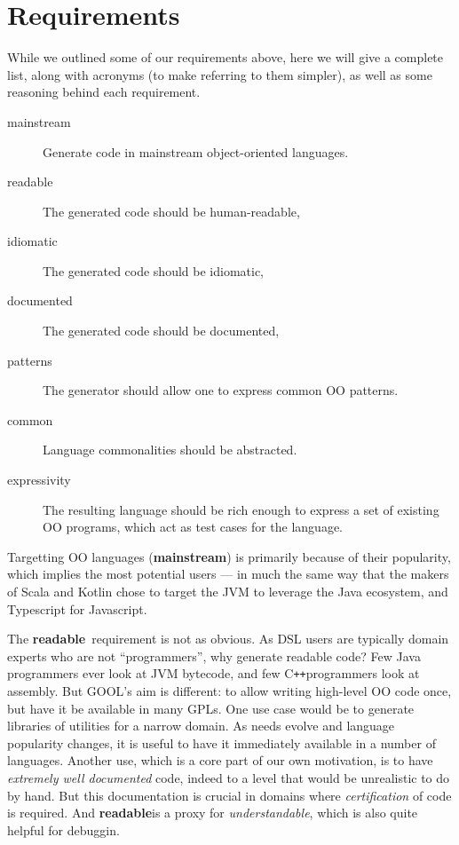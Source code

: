 \documentclass[sigplan,review,anonymous,prologue,dvipsnames]{acmart}
\newcommand{\Cplusplus}{C\texttt{++}}
\newcommand{\abbrev}[1]{\textbf{#1}}
\newcommand{\mainstream}{\abbrev{mainstream}}
\newcommand{\readable}{\abbrev{readable}}
\begin{document}
\section{Requirements} \label{sec:req}

While we outlined some of our requirements above, here we will give a
complete list, along with acronyms (to make referring to them simpler),
as well as some reasoning behind each requirement.

\begin{description}
\item[mainstream] Generate code in mainstream object-oriented languages.
\item[readable] The generated code should be human-readable,
\item[idiomatic] The generated code should be idiomatic,
\item[documented] The generated code should be documented,
\item[patterns] The generator should allow one to express common OO patterns.
\item[common] Language commonalities should be abstracted.
\item[expressivity] The resulting language should be rich enough to express a
set of existing OO programs, which act as test cases for the language.
\end{description}

Targetting OO languages (\mainstream) is primarily because of their popularity,
which implies the most potential users --- in much the same way that the makers
of Scala and Kotlin chose to target the JVM to leverage the Java ecosystem, and
Typescript for Javascript.

The \readable~requirement is not as obvious. As DSL users are typically
domain experts who are not ``programmers'', why generate readable code?
Few Java programmers ever look at JVM bytecode, and few \Cplusplus programmers
look at assembly. But GOOL's aim is different: to allow writing
high-level OO code once, but have it be available in many GPLs. One use case
would be to generate libraries of utilities for a narrow domain. As needs
evolve and language popularity changes, it is useful to have it immediately
available in a number of languages. Another use, which is a core part of our
own motivation, is to have \emph{extremely well documented} code, indeed to
a level that would be unrealistic to do by hand. But this documentation is
crucial in domains where \emph{certification} of code is required.  And
\readable is a proxy for \emph{understandable}, which is also quite
helpful for debuggin.
\end{document}
